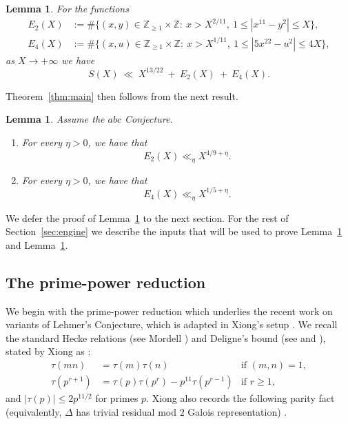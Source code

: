 \documentclass[12pt]{amsart}
\newtheorem{lemma}[theorem]{Lemma}
\theoremstyle{remark}
\numberwithin{equation}{section}
\begin{document}
\begin{lemma}\label{lem:reduction}
For the functions
\begin{displaymath}
\begin{split}
E_2(X)&:=\#\{(x,y)\in\mathbb Z_{\ge 1}\times\mathbb Z:\ x> X^{2/11},\ 1\le |x^{11}-y^2|\le X\},\\
E_4(X)&:=\#\{(x,u)\in\mathbb Z_{\ge 1}\times\mathbb Z:\ x> X^{1/11},\ 1\le |5x^{22}-u^2|\le 4X\},
\end{split}
\end{displaymath}
as $X\rightarrow +\infty$ we have
\[
S(X)\ \ll\ X^{13/22}\ +\ E_2(X)\ +\ E_4(X).
\]
\end{lemma}

Theorem~\ref{thm:main} then follows from the next result.

\begin{lemma}\label{lem:main_engine}
Assume the $abc$ Conjecture.
\begin{enumerate}
\item[(i)] For every $\eta>0$, we have that
$$E_2(X)\ll_{\eta} X^{4/9+\eta}.
$$
\item[(ii)] For every $\eta>0$, we have that
$$E_4(X)\ll_{\eta} X^{1/5+\eta}.
$$
\end{enumerate}
\end{lemma}

We defer the proof of Lemma~\ref{lem:main_engine} to the next section.
For the rest of Section~\ref{sec:engine}
we describe the inputs that will be used to prove Lemma~\ref{lem:reduction}
and Lemma~\ref{lem:main_engine}.

\subsection{The prime-power reduction}\label{subsec:21}
We begin with the prime-power reduction which underlies the recent work on variants of Lehmer's Conjecture,
which is adapted in Xiong's setup \cite[\S1--2]{Xiong2025}.
We recall the standard Hecke relations (see Mordell \cite{Mordell1917})
and Deligne's bound (see \cite[Theorem 8.2]{Deligne1974} and \cite{Deligne1980}),
stated by Xiong as \cite[Thm.~2.1]{Xiong2025}:
\begin{equation}
  \label{eq:hecke}
  \begin{aligned}
    \tau(mn) &=\tau(m)\tau(n) &\text{if }(m,n)=1, \\
    \tau(p^{r+1}) &= \tau(p)\tau(p^r)-p^{11}\tau(p^{r-1}) &\text{if }r\ge 1,
  \end{aligned}
\end{equation}
and $|\tau(p)|\le 2p^{11/2}$ for primes $p$.
Xiong also records the following parity fact (equivalently, $\Delta$ has trivial
residual mod $2$ Galois representation) \cite[Prop.~2.2]{Xiong2025}.
\end{document}
